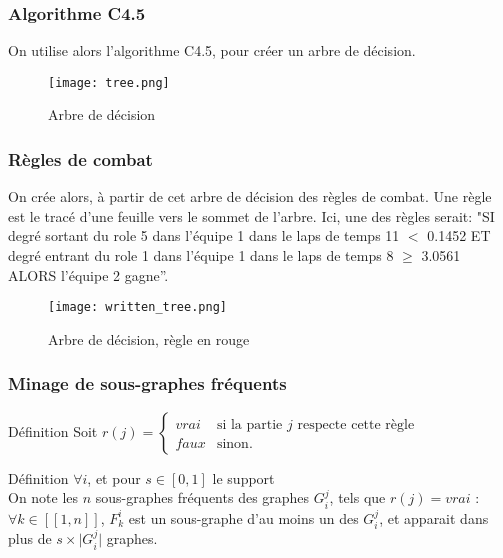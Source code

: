 \documentclass{beamer}
\begin{document}
\begin{frame}
    \frametitle{Algorithme C4.5}
    On utilise alors l'algorithme C4.5\cite{c4.5}, pour créer un arbre de décision. \newline \newline
    \begin{figure}
        \centering
        \texttt{[image: tree.png]}
        \caption{Arbre de décision}
    \end{figure}
\end{frame}

\begin{frame}
    \frametitle{Règles de combat}
    \footnotesize
    On crée alors, à partir de cet arbre de décision des règles de combat. Une règle est le tracé d'une feuille vers le sommet de l'arbre. \newline \newline
    Ici, une des règles serait: \newline \newline
    "SI degré sortant du role 5 dans l'équipe 1 dans le laps de temps 11 $<$ 0.1452 ET degré entrant du role 1 dans l'équipe 1 dans le laps de temps 8 $\ge$ 3.0561 ALORS l'équipe 2 gagne”.
    \begin{figure}
        \centering
        \texttt{[image: written\_tree.png]}
        \caption{Arbre de décision, règle en rouge}
    \end{figure}
\end{frame}

\begin{frame}
    \frametitle{Minage de sous-graphes fréquents\cite{fsm}}
    \begin{block}{Définition}
        Soit $r(j) = \left\{
        \begin{array}{ll}
            vrai & \mbox{si la partie } j \mbox{ respecte cette règle}\\
            faux & \mbox{sinon.}
        \end{array}
        \right.$
    \end{block}
    \begin{block}{Définition}
        $\forall i$, et pour $s \in [0,1]$ le support \\
        On note les $n$ sous-graphes fréquents des graphes $G_{i}^{j}$, tels que $r(j) = vrai$ : \\
        $\forall k \in [\![1,n]\!]$, $F^{i}_{k}$ est un sous-graphe d'au moins un des $G_{i}^{j}$, et apparait dans plus de $s \times \lvert G_{i}^{j} \rvert$ graphes.
    \end{block}
\end{frame}
\end{document}
